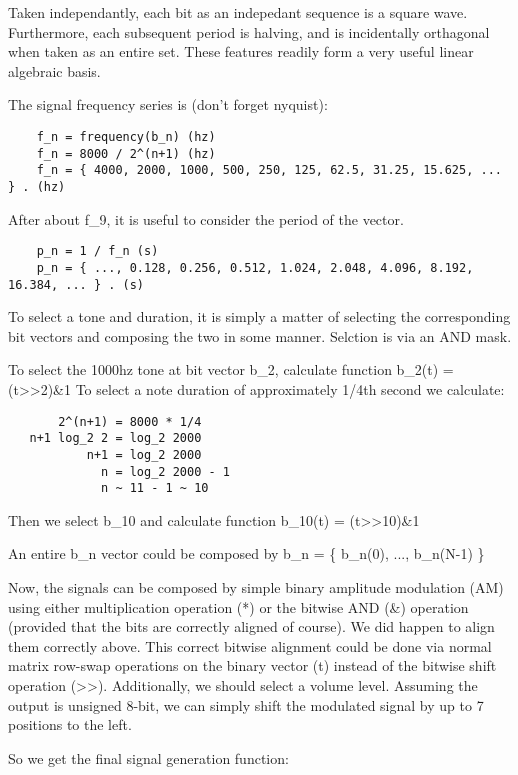 \documentclass[11pt]{book}
\begin{document}
Taken independantly, each bit as an indepedant sequence is a square wave. Furthermore, each subsequent period is halving, and
is incidentally orthagonal when taken as an entire set. These features readily form a very useful linear algebraic basis.

The signal frequency series is (don't forget nyquist):

\begin{verbatim}
	f_n = frequency(b_n) (hz)
	f_n = 8000 / 2^(n+1) (hz)
	f_n = { 4000, 2000, 1000, 500, 250, 125, 62.5, 31.25, 15.625, ... } . (hz)
\end{verbatim}

After about f\_9, it is useful to consider the period of the vector.

\begin{verbatim}
	p_n = 1 / f_n (s)
	p_n = { ..., 0.128, 0.256, 0.512, 1.024, 2.048, 4.096, 8.192, 16.384, ... } . (s)
\end{verbatim}

To select a tone and duration, it is simply a matter of selecting the corresponding bit vectors and composing the two in some manner.
Selction is via an AND mask.

To select the 1000hz tone at bit vector b\_2, calculate function b\_2(t) = (t>>2)\&1
To select a note duration of approximately 1/4th second we calculate:

\begin{verbatim}
       2^(n+1) = 8000 * 1/4
   n+1 log_2 2 = log_2 2000
           n+1 = log_2 2000
             n = log_2 2000 - 1
             n ~ 11 - 1 ~ 10
\end{verbatim}

Then we select b\_10 and calculate function b\_10(t) = (t>>10)\&1

An entire b\_n vector could be composed by b\_n = \{ b\_n(0), ..., b\_n(N-1) \}

Now, the signals can be composed by simple binary amplitude modulation (AM) using either multiplication operation (*) or the bitwise AND (\&)
operation (provided that the bits are correctly aligned of course). We did happen to align them correctly above. This correct bitwise alignment
could be done via normal matrix row-swap operations on the binary vector (t) instead of the bitwise shift operation (>>). Additionally, we
should select a volume level. Assuming the output is unsigned 8-bit, we can simply shift the modulated signal by up to 7 positions to the left.

So we get the final signal generation function:
\end{document}
